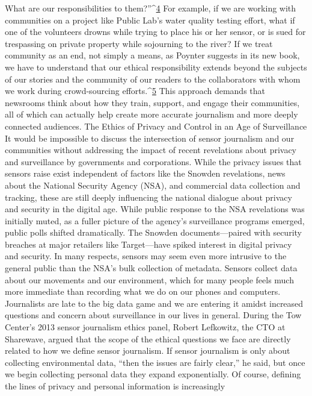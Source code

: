 What are our responsibilities to them?''^{\href{#endnotes-stearns}{4}} For example, if we are working
with communities on a project like Public Lab's water quality testing effort,
what if one of the volunteers drowns while trying to place his or her sensor,
or is sued for trespassing on private property while sojourning to the river?
If we treat community as an end, not simply a means, as Poynter suggests in
its new book, we have to understand that our ethical responsibility extends
beyond the subjects of our stories and the community of our readers to
the collaborators with whom we work during crowd-sourcing efforts.^{\href{#endnotes-stearns}{5}} This
approach demands that newsrooms think about how they train, support,
and engage their communities, all of which can actually help create more
accurate journalism and more deeply connected audiences.
The Ethics of Privacy and Control in
an Age of Surveillance
It would be impossible to discuss the intersection of sensor journalism and
our communities without addressing the impact of recent revelations about
privacy and surveillance by governments and corporations. While the privacy
issues that sensors raise exist independent of factors like the Snowden
revelations, news about the National Security Agency (NSA), and commercial
data collection and tracking, these are still deeply influencing the
national dialogue about privacy and security in the digital age.
While public response to the NSA revelations was initially muted, as a
fuller picture of the agency's surveillance programs emerged, public
polls shifted dramatically. The Snowden documents—paired with security breaches at major retailers like Target—have spiked interest in digital
privacy and security. In many respects, sensors may seem even more
intrusive to the general public than the NSA's bulk collection of metadata.
Sensors collect data about our movements and our environment, which
for many people feels much more immediate than recording what we do
on our phones and computers. Journalists are late to the big data game
and we are entering it amidst increased questions and concern about surveillance
in our lives in general.
During the Tow Center's 2013 sensor journalism ethics panel, Robert
Lefkowitz, the CTO at Sharewave, argued that the scope of the ethical questions
we face are directly related to how we define sensor journalism. If
sensor journalism is only about collecting environmental data, ``then the
issues are fairly clear,'' he said, but once we begin collecting personal data
they expand exponentially.
Of course, defining the lines of privacy and personal information is increasingly
